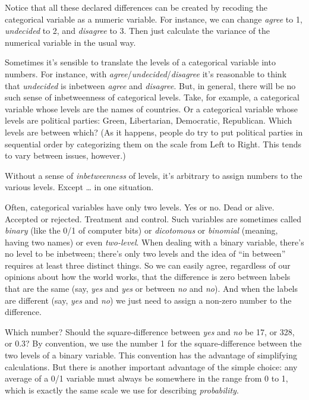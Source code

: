 \documentclass[]{book}
\begin{document}
Notice that all these declared differences can be created by recoding the categorical variable as a numeric variable. For instance, we can change \emph{agree} to 1, \emph{undecided} to 2, and \emph{disagree} to 3. Then just calculate the variance of the numerical variable in the usual way.

Sometimes it's sensible to translate the levels of a categorical variable into numbers. For instance, with \emph{agree}/\emph{undecided}/\emph{disagree} it's reasonable to think that \emph{undecided} is inbetween \emph{agree} and \emph{disagree}. But, in general, there will be no such sense of inbetweenness of categorical levels. Take, for example, a categorical variable whose levels are the names of countries. Or a categorical variable whose levels are political parties: Green, Libertarian, Democratic, Republican. Which levels are between which? (As it happens, people do try to put political parties in sequential order by categorizing them on the scale from Left to Right. This tends to vary between issues, however.)

Without a sense of \emph{inbetweenness} of levels, it's arbitrary to assign numbers to the various levels. Except \ldots{} in one situation.

Often, categorical variables have only two levels. Yes or no. Dead or alive. Accepted or rejected. Treatment and control. Such variables are sometimes called \emph{binary} (like the 0/1 of computer bits) or \emph{dicotomous} or \emph{binomial} (meaning, having two names) or even \emph{two-level}. When dealing with a binary variable, there's no level to be inbetween; there's only two levels and the idea of ``in between'' requires at least three distinct things. So we can easily agree, regardless of our opinions about how the world works, that the difference is zero between labels that are the same (say, \emph{yes} and \emph{yes} or between \emph{no} and \emph{no}). And when the labels are different (say, \emph{yes} and \emph{no}) we just need to assign a non-zero number to the difference.

Which number? Should the square-difference between \emph{yes} and \emph{no} be 17, or 328, or 0.3? By convention, we use the number 1 for the square-difference between the two levels of a binary variable. This convention has the advantage of simplifying calculations. But there is another important advantage of the simple choice: any average of a 0/1 variable must always be somewhere in the range from 0 to 1, which is exactly the same scale we use for describing \emph{probability}.
\end{document}
